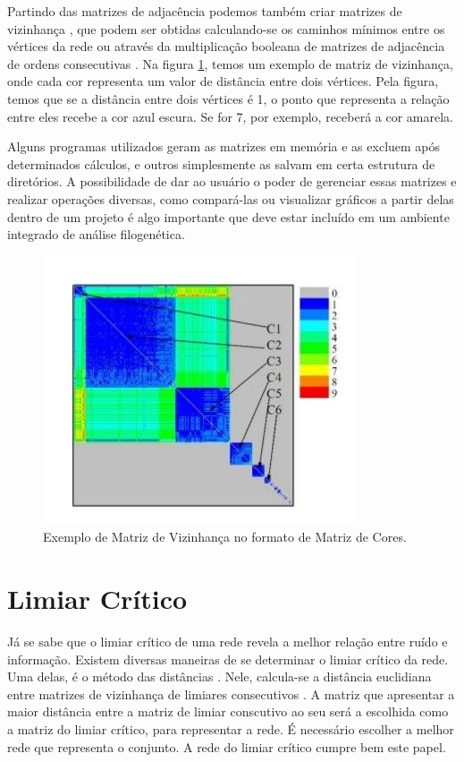 Partindo das matrizes de adjacência podemos também criar matrizes de vizinhança \cite{andrade2009}, que podem ser obtidas calculando-se os caminhos mínimos
\cite{bessa2008} entre os vértices da rede ou através da multiplicação booleana de matrizes de adjacência de ordens consecutivas \cite{andrade2006}. Na figura 
\ref{fig:matriz-vizinhanca}, temos um exemplo de matriz de vizinhança, onde cada cor representa um valor de distância entre dois vértices. Pela figura, temos
que se a distância entre dois vértices é 1, o ponto que representa a relação entre eles recebe a cor azul escura. Se for 7, por exemplo, receberá a cor
amarela.

Alguns programas utilizados geram as matrizes em memória e as excluem após determinados cálculos, e outros simplesmente as salvam em certa estrutura
de diretórios. A possibilidade de dar ao usuário o poder de gerenciar essas matrizes e realizar operações diversas, como compará-las ou visualizar gráficos
a partir delas dentro de um projeto é algo importante que deve estar incluído em um ambiente integrado de análise filogenética.

\begin{figure}
\centering
\includegraphics[scale=0.53]{matriz-vizinhanca}
\caption{Exemplo de Matriz de Vizinhança no formato de Matriz de Cores.}
\label{fig:matriz-vizinhanca}
\end{figure}

\section{Limiar Crítico} \label{sec:limcrit}

Já se sabe que o limiar crítico de uma rede revela a melhor relação entre ruído e informação. Existem diversas maneiras de se determinar o limiar
crítico da rede. Uma delas, é o método das distâncias \cite{andrade2011}. Nele, calcula-se a distância euclidiana entre matrizes de
vizinhança de limiares consecutivos \cite{andrade2008}. A matriz que apresentar a maior distância entre a matriz de limiar conscutivo
ao seu será a escolhida como a matriz do limiar crítico, para representar a rede. É necessário escolher a melhor rede que representa o conjunto.
A rede do limiar crítico cumpre bem este papel.

